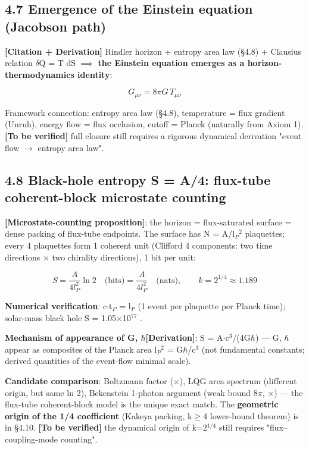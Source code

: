 \documentclass[12pt]{article}
\newcommand{\mtag}[1]{\textbf{[#1]}}
\newcommand{\up}[1]{\ensuremath{^{#1}}}
\newcommand{\down}[1]{\ensuremath{_{#1}}}
\begin{document}
\subsection{4.7 Emergence of the Einstein equation (Jacobson path)}

\mtag{Citation + Derivation} Rindler horizon + entropy area law (\S{}4.8) + Clausius relation \ensuremath{\delta}Q = T dS \ensuremath{\implies} \textbf{the Einstein equation emerges as a horizon-thermodynamics identity}:

\[G_{\mu\nu} = 8\pi G\,T_{\mu\nu}\]

Framework connection: entropy area law (\S{}4.8), temperature = flux gradient (Unruh), energy flow = flux occlusion, cutoff = Planck (naturally from Axiom 1). \mtag{To be verified} full closure still requires a rigorous dynamical derivation "event flow \ensuremath{\to} entropy area law".

\subsection{4.8 Black-hole entropy S = A/4: flux-tube coherent-block microstate counting}

\textbf{\mtag{Microstate-counting proposition}}: the horizon = flux-saturated surface = dense packing of flux-tube endpoints. The surface has N = A/l\down{P}\up{2} plaquettes; every 4 plaquettes form 1 coherent unit (Clifford 4 components: two time directions \ensuremath{\times} two chirality directions), 1 bit per unit:

\[S = \frac{A}{4l_P^2}\ln 2 \quad\text{(bits)} = \frac{A}{4l_P^2}\quad\text{(nats)},\qquad k = 2^{1/4} \approx 1.189\]

\textbf{Numerical verification}: c\ensuremath{\cdot}t\down{P} = l\down{P} (1 event per plaquette per Planck time); solar-mass black hole S = 1.05\ensuremath{\times}10\up{77} \checkmark.

\textbf{Mechanism of appearance of G, \ensuremath{\hbar}}\mtag{Derivation}: S = A\ensuremath{\cdot}c\up{3}/(4G\ensuremath{\hbar}) --- G, \ensuremath{\hbar} appear as composites of the Planck area l\down{P}\up{2} = G\ensuremath{\hbar}/c\up{3} (not fundamental constants; derived quantities of the event-flow minimal scale).

\textbf{Candidate comparison}: Boltzmann factor (\ensuremath{\times}), LQG area spectrum (different origin, but same ln 2), Bekenstein 1-photon argument (weak bound 8\ensuremath{\pi}, \ensuremath{\times}) --- the flux-tube coherent-block model is the unique exact match. The \textbf{geometric origin of the 1/4 coefficient} (Kakeya packing, k\ensuremath{\geq}4 lower-bound theorem) is in \S{}4.10. \mtag{To be verified} the dynamical origin of k=2\up{1/4} still requires "flux--coupling-mode counting".
\end{document}

